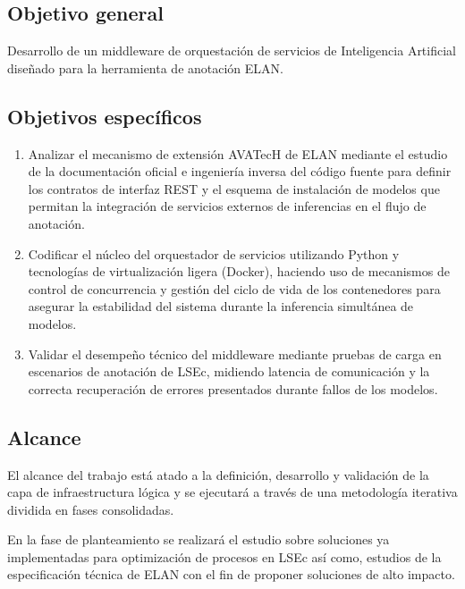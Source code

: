 \subsection{Objetivo general}
Desarrollo de un middleware de orquestación de servicios de Inteligencia Artificial diseñado para la herramienta de anotación ELAN.
\vspace{1\baselineskip}

\subsection{Objetivos específicos}

\begin{enumerate}
    \item Analizar el mecanismo de extensión AVATecH de ELAN mediante el estudio de la documentación oficial e ingeniería inversa del código fuente para definir los contratos de interfaz REST y el esquema de instalación de modelos que permitan la integración de servicios externos de inferencias en el flujo de anotación.
    \item Codificar el núcleo del orquestador de servicios utilizando Python y tecnologías de virtualización ligera (Docker), haciendo uso de mecanismos de control de concurrencia y gestión del ciclo de vida de los contenedores para asegurar la estabilidad del sistema durante la inferencia simultánea de modelos.
    \item Validar el desempeño técnico del middleware mediante pruebas de carga en escenarios de anotación de LSEc, midiendo latencia de comunicación y la correcta recuperación de errores presentados durante fallos de los modelos.
    \vspace{1\baselineskip}
\end{enumerate}

\subsection{Alcance}

El alcance del trabajo está atado a la definición, desarrollo y validación de la capa de infraestructura lógica y se ejecutará a través de una metodología iterativa dividida en fases consolidadas.

En la fase de planteamiento se realizará el estudio sobre soluciones ya implementadas para optimización de procesos en LSEc así como, estudios de la especificación técnica de ELAN con el fin de proponer soluciones de alto impacto.

